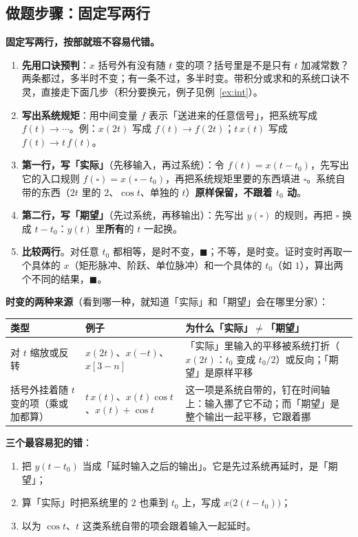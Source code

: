\documentclass[UTF8,a4paper,11pt]{ctexart}
\newcounter{ex}[section]
\begin{document}
\subsection{做题步骤：固定写两行}
\textbf{固定写两行，按部就班不容易代错。}
\begin{enumerate}[nosep]
\item \textbf{先用口诀预判}：$x$ 括号外有没有随 $t$ 变的项？括号里是不是只有 $t$ 加减常数？两条都过，多半时不变；有一条不过，多半时变。带积分或求和的系统口诀不灵，直接走下面几步（积分要换元，例子见例~\ref{ex:int}）。
\item \textbf{写出系统规矩}：用中间变量 $f$ 表示「送进来的任意信号」，把系统写成 $f(t)\to\cdots$。例：$x(2t)$ 写成 $f(t)\to f(2t)$；$t\,x(t)$ 写成 $f(t)\to t\,f(t)$。
\item \textbf{第一行，写「实际」}（先移输入，再过系统）：令 $f(t)=x(t-t_0)$，先写出它的入口规则 $f(\square)=x(\square-t_0)$，再把系统规矩里要的东西填进 $\square$。系统自带的东西（$2t$ 里的 $2$、$\cos t$、单独的 $t$）\textbf{原样保留，不跟着 $t_0$ 动}。
\item \textbf{第二行，写「期望」}（先过系统，再移输出）：先写出 $y(\square)$ 的规则，再把 $\square$ 换成 $t-t_0$：$y(t)$ 里\textbf{所有}的 $t$ 一起换。
\item \textbf{比较两行}。对任意 $t_0$ 都相等，是时不变，$\blacksquare$；不等，是时变。证时变时再取一个具体的 $x$（矩形脉冲、阶跃、单位脉冲）和一个具体的 $t_0$（如 $1$），算出两个不同的结果，$\blacksquare$。
\end{enumerate}

\textbf{时变的两种来源}（看到哪一种，就知道「实际」和「期望」会在哪里分家）：
\begin{center}
\renewcommand{\arraystretch}{1.3}
\begin{tabular}{@{}p{3.6cm}p{3.6cm}p{7.2cm}@{}}
\toprule
类型 & 例子 & 为什么「实际」$\neq$「期望」\\
\midrule
对 $t$ 缩放或反转 & $x(2t)$、$x(-t)$、$x[3-n]$ & 「实际」里输入的平移被系统打折（$x(2t)$：$t_0$ 变成 $t_0/2$）或反向；「期望」是原样平移\\
括号外挂着随 $t$ 变的项（乘或加都算） & $t\,x(t)$、$x(t)\cos t$、$x(t)+\cos t$ & 这一项是系统自带的，钉在时间轴上：输入挪了它不动；而「期望」是整个输出一起平移，它跟着挪\\
\bottomrule
\end{tabular}
\end{center}

\textbf{三个最容易犯的错}：
\begin{enumerate}[nosep]
\item 把 $y(t-t_0)$ 当成「延时输入之后的输出」。它是先过系统再延时，是「期望」；
\item 算「实际」时把系统里的 $2$ 也乘到 $t_0$ 上，写成 $x\bigl(2(t-t_0)\bigr)$；
\item 以为 $\cos t$、$t$ 这类系统自带的项会跟着输入一起延时。
\end{enumerate}
\end{document}
